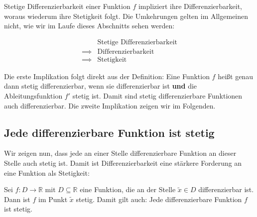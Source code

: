 \documentclass[fontsize=9pt,
               parskip=half-,
               DIV=14,
               listof=chapterentry,
               tocflat]{scrbook}
\begin{document}
Stetige Differenzierbarkeit einer Funktion $f$ impliziert ihre Differenzierbarkeit, woraus wiederum ihre Stetigkeit folgt. Die Umkehrungen gelten im Allgemeinen nicht, wie wir im Laufe dieses Abschnitts sehen werden:

\begin{align*}
&{\text{Stetige Differenzierbarkeit}}\\\implies {}&{\text{Differenzierbarkeit}}\\\implies {}&{\text{Stetigkeit}}
\end{align*}

Die erste Implikation folgt direkt aus der Definition: Eine Funktion $f$ heißt genau dann stetig differenzierbar, wenn sie differenzierbar ist \textbf{und} die Ableitungsfunktion $f'$ stetig ist. Damit sind stetig differenzierbare Funktionen auch differenzierbar. Die zweite Implikation zeigen wir im Folgenden.
\subsection{Jede differenzierbare Funktion ist stetig}

Wir zeigen nun, dass jede an einer Stelle differenzierbare Funktion an dieser Stelle auch stetig ist. Damit ist Differenzierbarkeit eine stärkere Forderung an eine Funktion als Stetigkeit:
\clearpage

\begin{theorem*}
Sei $f:D\to \mathbb {R} $ mit $D\subseteq \mathbb {R} $ eine Funktion, die an der Stelle ${\tilde {x}}\in D$ differenzierbar ist. Dann ist $f$ im Punkt ${\tilde {x}}$ stetig. Damit gilt auch: Jede differenzierbare Funktion $f$ ist stetig.

\end{theorem*}
\end{document}
